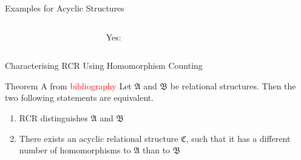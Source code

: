 \documentclass[aspectratio=169]{beamer}
\begin{document}
\begin{frame}{Examples for Acyclic Structures}
\begin{columns}
\begin{column}{0.4\textwidth}
			\end{column}
			\begin{column}{0.2\textwidth}
				\centering
				\hfill Yes:
			\end{column}
			\begin{column}{0.4\textwidth}
				\centering
			\end{column}
		\end{columns}
	\end{frame}
	
	\begin{frame}{Characterising RCR Using Homomorphism Counting}
		\begin{block}{Theorem A from \textcolor{red}{bibliography}}
			Let $\mathfrak A$ and $\mathfrak B$ be relational structures.
			Then the two following statements are equivalent.
			\begin{enumerate}
				\item RCR distinguishes $\mathfrak A$ and $\mathfrak B$
				\item There exists an acyclic relational structure $\mathfrak C$, such that it has a different number of homomorphisms to $\mathfrak A$ than to $\mathfrak B$
			\end{enumerate}
		\end{block}
	\end{frame}
	
\end{document}
